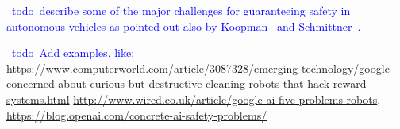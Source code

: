 \documentclass[sigconf,review, anonymous]{acmart}
\newcommand{\todo}[1]{\textcolor{blue}{\ding{46}~{\sf todo}~#1}}
\begin{document}

\todo{describe some of the major challenges for guaranteeing safety in autonomous vehicles as pointed out also by Koopman~\cite{Koopman:2016hh} and Schmittner~\cite{Schmittner:2014dn}.}

\todo{Add examples, like: \url{https://www.computerworld.com/article/3087328/emerging-technology/google-concerned-about-curious-but-destructive-cleaning-robots-that-hack-reward-systems.html}
\url{http://www.wired.co.uk/article/google-ai-five-problems-robots},
\url{https://blog.openai.com/concrete-ai-safety-problems/}}

\end{document}

